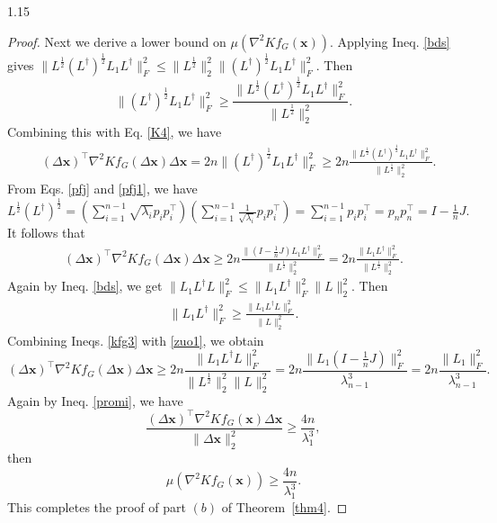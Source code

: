 \documentclass[preprint,12pt]{elsarticle1}
\numberwithin{equation}{section}
\begin{document}
\begin{spacing}{1.15}
\begin{proof}
Next we derive a lower bound on $\mu(\nabla^{2}Kf_{G}(\mathbf{x}))$. Applying  Ineq.  \eqref{bds} gives
$\|L^{\frac{1}{2}}(L^{\dag})^{\frac{1}{2}}L_{1}L^{\dag}\|_{F}^{2}\leq \|L^{\frac{1}{2}}\|_{2}^{2}
\|(L^{\dag})^{\frac{1}{2}}L_{1}L^{\dag}\|^{2}_{F}.$
Then
$$\|(L^{\dag})^{\frac{1}{2}}L_{1}L^{\dag}\|^{2}_{F}\geq
\frac{\|L^{\frac{1}{2}}(L^{\dag})^{\frac{1}{2}}L_{1}L^{\dag}\|_{F}^{2}}{\|L^{\frac{1}{2}}\|_{2}^{2}}.$$
 Combining this with Eq. \eqref{K4}, we have \begin{align}\nonumber
&(\Delta \mathbf{x})^{\top} \nabla^{2} Kf_{G}(\Delta \mathbf{x}) \Delta \mathbf{\mathbf{x}}
=2n\|(L^{\dag})^{\frac{1}{2}}L_{1}L^{\dag}\|^{2}_{F}\geq
2n\frac{\|L^{\frac{1}{2}}(L^{\dag})^{\frac{1}{2}}L_{1}L^{\dag}\|_{F}^{2}}{\|L^{\frac{1}{2}}\|_{2}^{2}}.
\end{align}
From Eqs. \eqref{pfj} and \eqref{pfj1}, we have $L^{\frac{1}{2}}(L^{\dag})^{\frac{1}{2}}=(\sum_{i=1}^{n-1}\sqrt{\lambda_{i}}p_{i}p_{i}^{\top})
(\sum_{i=1}^{n-1}\frac{1}{\sqrt{\lambda_{i}}}p_{i}p_{i}^{\top})=\sum_{i=1}^{n-1}p_{i}p_{i}^{\top}=p_{n}p_{n}^{\top}
=I-\frac{1}{n}J.$ It follows that
\begin{align}\label{kfg3}(\Delta \mathbf{x})^{\top} \nabla^{2} Kf_{G}(\Delta \mathbf{x}) \Delta \mathbf{\mathbf{x}}
\geq 2n\frac{\|(I-\frac{1}{n}J)L_{1}L^{\dag}\|_{F}^{2}}{\|L^{\frac{1}{2}}\|_{2}^{2}}
=2n\frac{\|L_{1}L^{\dag}\|_{F}^{2}}{\|L^{\frac{1}{2}}\|_{2}^{2}}.\end{align}
Again by  Ineq.  \eqref{bds}, we get
$\|L_{1}L^{\dag}L\|_{F}^{2}\leq \|L_{1}L^{\dag}\|_{F}^{2}\|L\|_{2}^{2}.$ Then
\begin{align}\label{zuo1}\|L_{1}L^{\dag}\|_{F}^{2}\geq \frac{\|L_{1}L^{\dag}L\|_{F}^{2}}{\|L\|_{2}^{2}}.\end{align}
Combining  Ineqs.  \eqref{kfg3} with \eqref{zuo1}, we obtain
$$(\Delta \mathbf{x})^{\top} \nabla^{2} Kf_{G}(\Delta \mathbf{x}) \Delta \mathbf{\mathbf{x}}
\geq2n\frac{\|L_{1}L^{\dag}L\|_{F}^{2}}{\|L^{\frac{1}{2}}\|_{2}^{2}\|L\|_{2}^{2}}
=2n\frac{\|L_{1}(I-\frac{1}{n}J)\|_{F}^{2}}{\lambda_{n-1}^{3}}
=2n\frac{\|L_{1}\|_{F}^{2}}{\lambda_{n-1}^{3}}.$$
Again by  Ineq.  \eqref{promi}, we have $$\frac{(\Delta \textbf{x})^{\top} \nabla^{2} Kf_{G}(\textbf{x})\Delta \textbf{x}}{\|\Delta \textbf{x} \|_{2}^{2}}\geq\frac{4n}{\lambda_{1}^{3}},$$
then $$\mu(\nabla^{2}Kf_{G}(\mathbf{x}))\geq \frac{4n}{\lambda_{1}^{3}}.$$
This completes the proof of part $(b)$ of Theorem~\ref{thm4}.
\end{proof}
\end{spacing}
\end{document}
